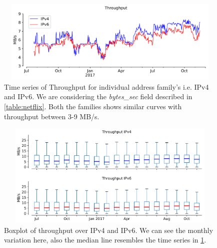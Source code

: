 \begin{figure}[!ht]
	\centering
	\includegraphics[keepaspectratio, height=4cm, width=15cm]{figures/throughput/netflix-throughput-timeseries-separate.pdf}
	\caption[Throughput Timeseries for IPv4 and Ipv6]{Time series of Throughput for individual address family's i.e. IPv4 and IPv6. We are considering the \textit{bytes\_sec} field described in \cref{table:netflix}. Both the families shows similar curves with throughput between 3-9 MB/s.}
	\label{fig:Throughput Timeseries for IPv4 and Ipv6}
\end{figure}
\begin{figure}[!ht]
	\centering
	\includegraphics[keepaspectratio, height=5cm, width=15cm]{figures/throughput/netflix-throughput-boxplot-separate.pdf}
	\caption[Throughput Boxplot for IPv4 and IPv6]{Boxplot of throughput over IPv4 and IPv6. We can see the monthly variation here, also the median line resembles the time series in \cref{fig:Throughput Timeseries for IPv4 and Ipv6}.}
	\label{fig:Throughput Boxplot for IPv4 and IPv6}
\end{figure}


